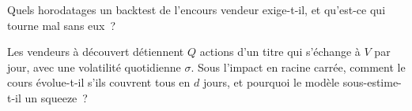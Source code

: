 \begin{interviewq}\label{iq:s1:short-interest-borrow-and-crowding:5}
Quels horodatages un backtest de l'encours vendeur exige-t-il, et qu'est-ce qui tourne mal sans eux~?
\end{interviewq}

\begin{interviewq}\label{iq:s1:short-interest-borrow-and-crowding:6}
Les vendeurs à découvert détiennent $Q$ actions d'un titre qui s'échange à $V$ par jour, avec une volatilité quotidienne $\sigma$. Sous l'impact en racine carrée, comment le cours évolue-t-il s'ils couvrent tous en
$d$ jours, et pourquoi le modèle sous-estime-t-il un squeeze~?
\end{interviewq}
